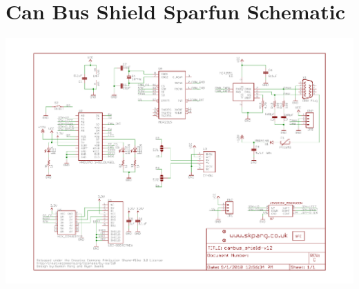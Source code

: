 \chapter{\normalsize Can Bus Shield Sparfun Schematic}

\begin{center}
  \includegraphics[scale=0.6]{canbus_shield-v12}  
	
\end{center}